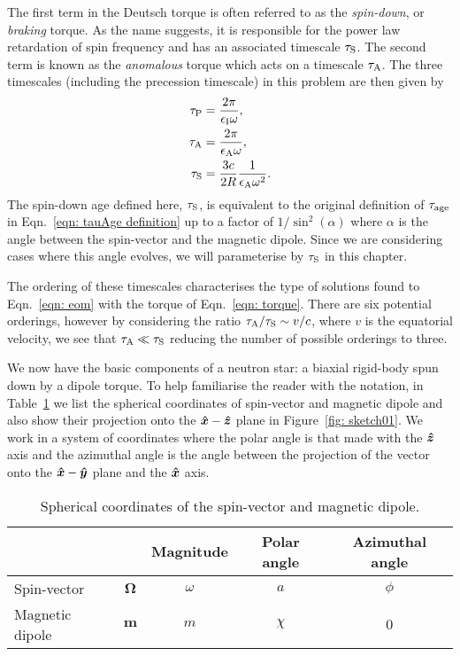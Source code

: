 \documentclass[../full_thesis/full_thesis.tex]{subfiles}
\begin{document}
The first term in the Deutsch torque is often referred to as the
\emph{spin-down}, or \emph{braking} torque. As the name suggests, it is
responsible for the power law retardation of spin frequency and has an
associated timescale $\tau_{\mathrm{S}}$. The second term is known as the
\emph{anomalous} torque which acts on a timescale $\tau_{\mathrm{A}}$. The three
timescales (including the precession timescale) in this problem are then given
by
\begin{align}
\tau_{\mathrm{P}} &=\frac{2\pi}{\epsilon_{\mathrm{I}}\omega},  \\
\tau_{\mathrm{A}} &=\frac{2\pi}{\epsilon_{\mathrm{A}}\omega}, \label{eqn: anomalous timescale} \\
\tau_{\mathrm{S}} &=\frac{3c}{2R}\frac{1}{\epsilon_{\mathrm{A}}\omega^{2}}.
\end{align}
The spin-down age defined here, $\tau_{\mathrm{S}}$, is equivalent to the original
definition of $\tau_{\mathrm{age}}$ in Eqn.~\eqref{eqn: tauAge definition} up to a factor
of $1/\sin^{2}(\alpha)$ where $\alpha$ is the angle between the spin-vector and
the magnetic dipole. Since we are considering cases where this angle evolves, we
will parameterise by $\tau_{\mathrm{S}}$ in this chapter.

The ordering of these timescales characterises the type of solutions found to
Eqn.~\eqref{eqn: eom} with the torque of Eqn.~\eqref{eqn: torque}. There are
six potential orderings, however by considering the ratio $\tau_{\mathrm{A}}/\tau_{\mathrm{S}}
\sim v/c$, where $v$ is the equatorial velocity, we see that $\tau_{\mathrm{A}} \ll
\tau_{\mathrm{S}}$ reducing the number of possible orderings to three.

We now have the basic components of a neutron star: a biaxial rigid-body spun
down by a dipole torque. To help familiarise the reader with the notation, in
Table~\ref{tab: definitions} we list the spherical coordinates of spin-vector
and magnetic dipole and also show their projection onto the $\boldsymbol{\hat{x}}-\boldsymbol{\hat{z}}$ plane in
Figure~\ref{fig: sketch01}. We work in a system of coordinates where the polar
angle is that made with the $\boldsymbol{\hat{z}}$ axis and the azimuthal angle is the angle between
the projection of the vector onto the $\boldsymbol{\hat{x}}-\boldsymbol{\hat{y}}$ plane and the $\boldsymbol{\hat{x}}$ axis.
\begin{table}[ht]
\centering
\begin{tabular}{|l|c|c|c|c|} \hline
 \multicolumn{2}{|c|}{} & Magnitude & Polar angle & Azimuthal angle \\ \hline
Spin-vector  & $\boldsymbol{\Omega}$ & $\omega$ & $a$ & $\phi$ \\ \hline
Magnetic dipole &  $\boldsymbol{m}$ & $m$ & $\chi$ & 0 \\ \hline
\end{tabular}
\caption{Spherical coordinates of the spin-vector and magnetic dipole.}
\label{tab: definitions}
\end{table}
\end{document}
